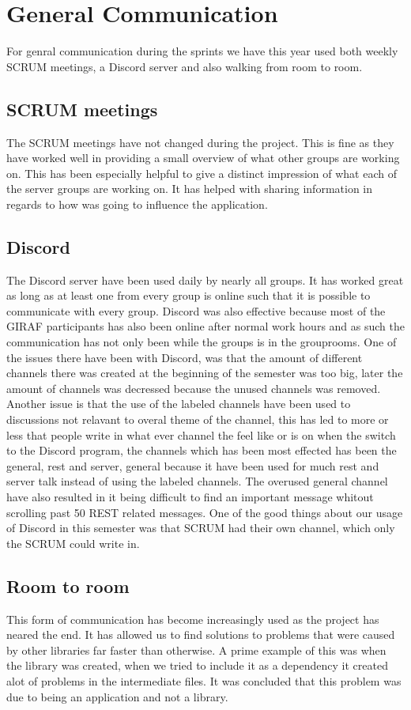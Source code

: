 \section{General Communication}
For genral communication during the sprints we have this year used both weekly
SCRUM meetings, a Discord server and also walking from room to room.

\subsection{SCRUM meetings}
The SCRUM meetings have not changed during the project. This is fine as they
have worked well in providing a small overview of what other groups are working
on. This has been especially helpful to give a distinct impression of what each
of the server groups are working on. It has helped with sharing information in
regards to how  was going to influence the application.

\subsection{Discord}
The Discord server have been used daily by nearly all groups. It has worked
great as long as at least one from every group is online such that it is
possible to communicate with every group. Discord was also effective because
most of the GIRAF participants has also been online after normal work hours and
as such the communication has not only been while the groups is in the grouprooms.
One of the issues there have been with Discord, was that the amount of different
channels there was created at the beginning of the semester was too big, later
the amount of channels was decressed because the unused channels was removed.
Another issue is that the use of the labeled channels have been used to
discussions not relavant to overal theme of the channel, this has led to more or
less that people write in what ever channel the feel like or is on when the
switch to the Discord program, the channels which has been most effected has
been the general, rest and server, general because it have been used for much
rest and server talk instead of using the labeled channels. The overused general
channel have also resulted in it being difficult to find an important message
whitout scrolling past 50 REST related messages. One of the good things about
our usage of Discord in this semester was that SCRUM had their own channel,
which only the SCRUM could write in.

\subsection{Room to room}
This form of communication has become increasingly used as the project has
neared the end. It has allowed us to find solutions to problems that were caused by
other libraries far faster than otherwise. A prime example of this was when the
 library was created, when we tried to include it as a
dependency it created alot of problems in the intermediate files. It was
concluded that this problem was due to  being an application
and not a library.
